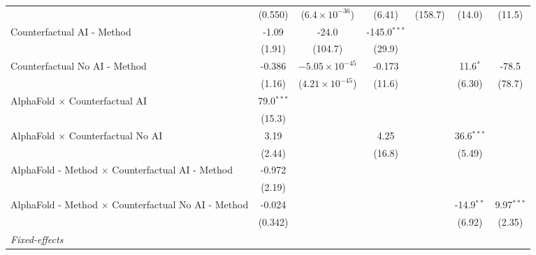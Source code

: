 \begin{tabular}{lcccccc}
                                                              & (0.550)      & ($6.4\times 10^{-36}$)   & (6.41)         & (158.7) & (14.0)        & (11.5)\\   
   Counterfactual AI - Method                                 & -1.09        & -24.0                    & -145.0$^{***}$ &         &               &   \\   
                                                              & (1.91)       & (104.7)                  & (29.9)         &         &               &   \\   
   Counterfactual No AI - Method                              & -0.386       & $-5.05\times 10^{-45}$   & -0.173         &         & 11.6$^{*}$    & -78.5\\   
                                                              & (1.16)       & ($4.21\times 10^{-45}$)  & (11.6)         &         & (6.30)        & (78.7)\\   
   AlphaFold $\times$ Counterfactual AI                       & 79.0$^{***}$ &                          &                &         &               &   \\   
                                                              & (15.3)       &                          &                &         &               &   \\   
   AlphaFold $\times$ Counterfactual No AI                    & 3.19         &                          & 4.25           &         & 36.6$^{***}$  &   \\   
                                                              & (2.44)       &                          & (16.8)         &         & (5.49)        &   \\   
   AlphaFold - Method $\times$ Counterfactual AI - Method     & -0.972       &                          &                &         &               &   \\   
                                                              & (2.19)       &                          &                &         &               &   \\   
   AlphaFold - Method $\times$ Counterfactual No AI - Method  & -0.024       &                          &                &         & -14.9$^{**}$  & 9.97$^{***}$\\   
                                                              & (0.342)      &                          &                &         & (6.92)        & (2.35)\\   
   \midrule
   \emph{Fixed-effects}\\

\end{tabular}
